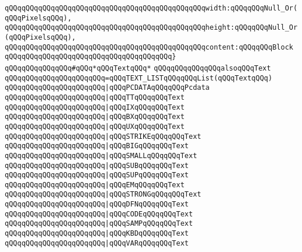 \verb|qQQqqQQqqQQqqQQqqQQqqQQqqQQqqQQqqQQqqQQqqQQqqQQqwidth:qQQqqQQqNull_Or(qQQqPixelsqQQq),|\newline
\verb|qQQqqQQqqQQqqQQqqQQqqQQqqQQqqQQqqQQqqQQqqQQqqQQqheight:qQQqqQQqNull_Or(qQQqPixelsqQQq),|\newline
\verb|qQQqqQQqqQQqqQQqqQQqqQQqqQQqqQQqqQQqqQQqqQQqqQQqcontent:qQQqqQQqBlock|\newline
\verb|qQQqqQQqqQQqqQQqqQQqqQQqqQQqqQQqqQQqqQQq}|\newline
\newline
\verb|qQQqqQQqqQQqqQQq#qQQq*qQQqTextqQQq*|\newline
\verb|qQQqqQQqqQQqqQQqalsoqQQqText|\newline
\verb|qQQqqQQqqQQqqQQqqQQqqQQq=qQQqTEXT_LISTqQQqqQQqList(qQQqTextqQQq)|\newline
\verb|qQQqqQQqqQQqqQQqqQQqqQQq|\verb#|qQQqPCDATAqQQqqQQqPcdata#\newline
\verb|qQQqqQQqqQQqqQQqqQQqqQQq|\verb#|qQQqTTqQQqqQQqText#\newline
\verb|qQQqqQQqqQQqqQQqqQQqqQQq|\verb#|qQQqIXqQQqqQQqText#\newline
\verb|qQQqqQQqqQQqqQQqqQQqqQQq|\verb#|qQQqBXqQQqqQQqText#\newline
\verb|qQQqqQQqqQQqqQQqqQQqqQQq|\verb#|qQQqUXqQQqqQQqText#\newline
\verb|qQQqqQQqqQQqqQQqqQQqqQQq|\verb#|qQQqSTRIKEqQQqqQQqText#\newline
\verb|qQQqqQQqqQQqqQQqqQQqqQQq|\verb#|qQQqBIGqQQqqQQqText#\newline
\verb|qQQqqQQqqQQqqQQqqQQqqQQq|\verb#|qQQqSMALLqQQqqQQqText#\newline
\verb|qQQqqQQqqQQqqQQqqQQqqQQq|\verb#|qQQqSUBqQQqqQQqText#\newline
\verb|qQQqqQQqqQQqqQQqqQQqqQQq|\verb#|qQQqSUPqQQqqQQqText#\newline
\verb|qQQqqQQqqQQqqQQqqQQqqQQq|\verb#|qQQqEMqQQqqQQqText#\newline
\verb|qQQqqQQqqQQqqQQqqQQqqQQq|\verb#|qQQqSTRONGqQQqqQQqText#\newline
\verb|qQQqqQQqqQQqqQQqqQQqqQQq|\verb#|qQQqDFNqQQqqQQqText#\newline
\verb|qQQqqQQqqQQqqQQqqQQqqQQq|\verb#|qQQqCODEqQQqqQQqText#\newline
\verb|qQQqqQQqqQQqqQQqqQQqqQQq|\verb#|qQQqSAMPqQQqqQQqText#\newline
\verb|qQQqqQQqqQQqqQQqqQQqqQQq|\verb#|qQQqKBDqQQqqQQqText#\newline
\verb|qQQqqQQqqQQqqQQqqQQqqQQq|\verb#|qQQqVARqQQqqQQqText#\newline
